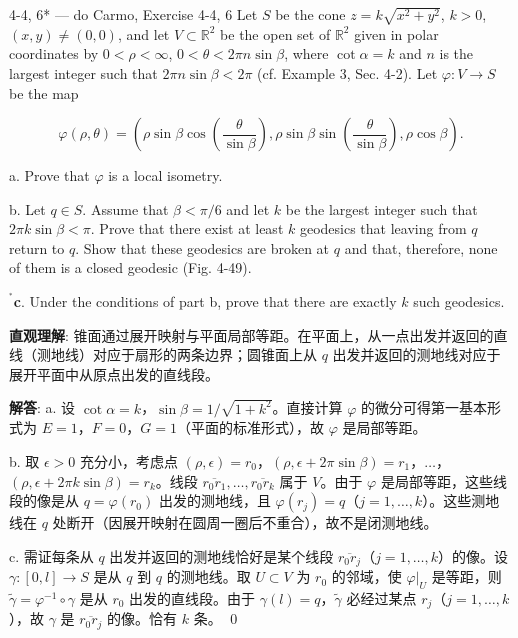 \begin{exercise}{4-4, 6* — do Carmo, Exercise 4-4, 6}
Let $S$ be the cone $z = k\sqrt{x^2 + y^2}$, $k > 0$, $(x, y) \neq (0, 0)$, and let $V \subset \mathbb{R}^2$ be the open set of $\mathbb{R}^2$ given in polar coordinates by $0 < \rho < \infty$, $0 < \theta < 2\pi n \sin \beta$, where $\cot \alpha = k$ and $n$ is the largest integer such that $2\pi n \sin \beta < 2\pi$ (cf. Example 3, Sec. 4-2). Let $\varphi: V \to S$ be the map

\[
\varphi(\rho, \theta) = \left(\rho \sin \beta \cos \left(\frac{\theta}{\sin \beta}\right), \rho \sin \beta \sin \left(\frac{\theta}{\sin \beta}\right), \rho \cos \beta\right).
\]

a. Prove that $\varphi$ is a local isometry.

b. Let $q \in S$. Assume that $\beta < \pi / 6$ and let $k$ be the largest integer such that $2\pi k \sin \beta < \pi$. Prove that there exist at least $k$ geodesics that leaving from $q$ return to $q$. Show that these geodesics are broken at $q$ and that, therefore, none of them is a closed geodesic (Fig. 4-49).

$^{^*}$\textbf{c}. Under the conditions of part b, prove that there are exactly $k$ such geodesics.
\end{exercise}

\begin{solution}
\textbf{直观理解}: 锥面通过展开映射与平面局部等距。在平面上，从一点出发并返回的直线（测地线）对应于扇形的两条边界；圆锥面上从 $q$ 出发并返回的测地线对应于展开平面中从原点出发的直线段。

\textbf{解答}: a. 设 $\cot\alpha=k$，$\sin\beta = 1/\sqrt{1+k^2}$。直接计算 $\varphi$ 的微分可得第一基本形式为 $E=1$，$F=0$，$G=1$（平面的标准形式），故 $\varphi$ 是局部等距。

b. 取 $\epsilon>0$ 充分小，考虑点 $(\rho,\epsilon)=r_0$，$(\rho,\epsilon+2\pi\sin\beta)=r_1$，$\ldots$，$(\rho,\epsilon+2\pi k\sin\beta)=r_k$。线段 $\overline{r_0r_1},\ldots,\overline{r_0r_k}$ 属于 $V$。由于 $\varphi$ 是局部等距，这些线段的像是从 $q=\varphi(r_0)$ 出发的测地线，且 $\varphi(r_j)=q$（$j=1,\ldots,k$）。这些测地线在 $q$ 处断开（因展开映射在圆周一圈后不重合），故不是闭测地线。

c. 需证每条从 $q$ 出发并返回的测地线恰好是某个线段 $\overline{r_0r_j}$（$j=1,\ldots,k$）的像。设 $\gamma:[0,l]\to S$ 是从 $q$ 到 $q$ 的测地线。取 $U\subset V$ 为 $r_0$ 的邻域，使 $\varphi|_U$ 是等距，则 $\tilde{\gamma} = \varphi^{-1}\circ\gamma$ 是从 $r_0$ 出发的直线段。由于 $\gamma(l)=q$，$\tilde{\gamma}$ 必经过某点 $r_j$（$j=1,\ldots,k$），故 $\gamma$ 是 $\overline{r_0r_j}$ 的像。恰有 $k$ 条。
\qed
\end{solution}

